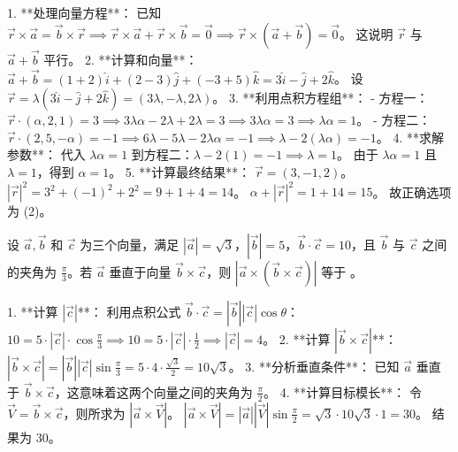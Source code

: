 \begin{questions}
\begin{solution}
1. **处理向量方程**：
   已知 $\vec{r} \times \vec{a} = \vec{b} \times \vec{r} \implies \vec{r} \times \vec{a} + \vec{r} \times \vec{b} = \vec{0} \implies \vec{r} \times (\vec{a} + \vec{b}) = \vec{0}$。
   这说明 $\vec{r}$ 与 $\vec{a} + \vec{b}$ 平行。
2. **计算和向量**：
   $\vec{a} + \vec{b} = (1+2)\hat{i} + (2-3)\hat{j} + (-3+5)\hat{k} = 3\hat{i} - \hat{j} + 2\hat{k}$。
   设 $\vec{r} = \lambda(3\hat{i} - \hat{j} + 2\hat{k}) = (3\lambda, -\lambda, 2\lambda)$。
3. **利用点积方程组**：
   - 方程一：$\vec{r} \cdot (\alpha, 2, 1) = 3 \implies 3\lambda\alpha - 2\lambda + 2\lambda = 3 \implies 3\lambda\alpha = 3 \implies \lambda\alpha = 1$。
   - 方程二：$\vec{r} \cdot (2, 5, -\alpha) = -1 \implies 6\lambda - 5\lambda - 2\lambda\alpha = -1 \implies \lambda - 2(\lambda\alpha) = -1$。
4. **求解参数**：
   代入 $\lambda\alpha = 1$ 到方程二：$\lambda - 2(1) = -1 \implies \lambda = 1$。
   由于 $\lambda\alpha = 1$ 且 $\lambda = 1$，得到 $\alpha = 1$。
5. **计算最终结果**：
   $\vec{r} = (3, -1, 2)$。
   $|\vec{r}|^2 = 3^2 + (-1)^2 + 2^2 = 9 + 1 + 4 = 14$。
   $\alpha + |\vec{r}|^2 = 1 + 14 = 15$。
故正确选项为 (2)。
\end{solution}

\question
设 $\vec{a}, \vec{b}$ 和 $\vec{c}$ 为三个向量，满足 $|\vec{a}| = \sqrt{3}$，$|\vec{b}| = 5$，$\vec{b} \cdot \vec{c} = 10$，且 $\vec{b}$ 与 $\vec{c}$ 之间的夹角为 $\frac{\pi}{3}$。若 $\vec{a}$ 垂直于向量 $\vec{b} \times \vec{c}$，则 $|\vec{a} \times (\vec{b} \times \vec{c})|$ 等于 \underline{\quad}。

\begin{solution}
1. **计算 $|\vec{c}|$**：
   利用点积公式 $\vec{b} \cdot \vec{c} = |\vec{b}| |\vec{c}| \cos\theta$：
   $10 = 5 \cdot |\vec{c}| \cdot \cos\frac{\pi}{3} \implies 10 = 5 \cdot |\vec{c}| \cdot \frac{1}{2} \implies |\vec{c}| = 4$。
2. **计算 $|\vec{b} \times \vec{c}|$**：
   $|\vec{b} \times \vec{c}| = |\vec{b}| |\vec{c}| \sin\frac{\pi}{3} = 5 \cdot 4 \cdot \frac{\sqrt{3}}{2} = 10\sqrt{3}$。
3. **分析垂直条件**：
   已知 $\vec{a}$ 垂直于 $\vec{b} \times \vec{c}$，这意味着这两个向量之间的夹角为 $\frac{\pi}{2}$。
4. **计算目标模长**：
   令 $\vec{V} = \vec{b} \times \vec{c}$，则所求为 $|\vec{a} \times \vec{V}|$。
   $|\vec{a} \times \vec{V}| = |\vec{a}| |\vec{V}| \sin\frac{\pi}{2} = \sqrt{3} \cdot 10\sqrt{3} \cdot 1 = 30$。
结果为 30。
\end{solution}


\end{questions}
